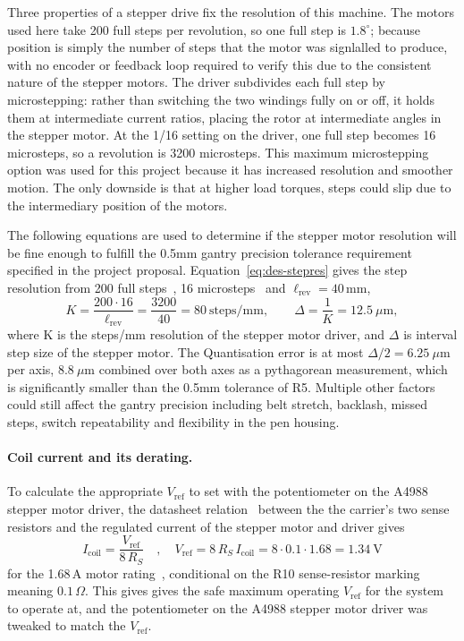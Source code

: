 Three properties of a stepper drive fix the resolution of this machine. The motors used here take 200 full steps per revolution, so one full step is $1.8^\circ$; because position is simply the number of steps that the motor was signlalled to produce, with no encoder or feedback loop required to verify this due to the consistent nature of the stepper motors. The driver subdivides each full step by microstepping: rather than switching the two windings fully on or off, it holds them at intermediate current ratios, placing the rotor at intermediate angles in the stepper motor. At the 1/16 setting on the driver, one full step becomes 16 microsteps, so a revolution is 3200 microsteps. This maximum microstepping option was used for this project because it has increased resolution and smoother motion. The only downside is that at higher load torques, steps could slip due to the intermediary position of the motors.

The following equations are used to determine if the stepper motor resolution will be fine enough to fulfill the 0.5mm gantry precision tolerance requirement specified in the project proposal. Equation~\ref{eq:des-stepres} gives the step resolution from 200 full steps~\cite{stepperds}, 16 microsteps~\cite[p.~6]{a4988ds} and $\ell_{\mathrm{rev}}=40$\,mm,
\begin{equation}
K=\frac{200\cdot16}{\ell_{\mathrm{rev}}}=\frac{3200}{40}=80\ \mathrm{steps/mm},\qquad\Delta=\frac1K=12.5\ \mu\mathrm{m},
\label{eq:des-stepres}
\end{equation}
where K is the steps/mm resolution of the stepper motor driver, and $\Delta$ is interval step size of the stepper motor. The  Quantisation error is at most $\Delta/2=6.25\ \mu$m per axis, $8.8\ \mu$m combined over both axes as a pythagorean measurement, which is significantly smaller than the 0.5mm tolerance of R5. Multiple other factors could still affect the gantry precision including belt stretch, backlash, missed steps, switch repeatability and flexibility in the pen housing.
\paragraph{Coil current and its derating.}
To calculate the appropriate $V_{\mathrm{ref}}$ to set with the potentiometer on the A4988 stepper motor driver, the datasheet relation~\cite[p.~9]{a4988ds} between the the carrier's two sense resistors and the regulated current of the stepper motor and driver gives
\begin{equation}
I_{\mathrm{coil}}=\frac{V_{\mathrm{ref}}}{8\,R_S}\quad, \quad V_{\mathrm{ref}}=8\,R_S\,I_{\mathrm{coil}}=8\cdot0.1\cdot1.68=1.34\ \mathrm{V}
\label{eq:des-current}
\end{equation}
for the 1.68\,A motor rating~\cite{stepperds}, conditional on the R10 sense-resistor marking meaning $0.1\,\Omega$. This gives gives the safe maximum operating $V_{\mathrm{ref}}$ for the system to operate at, and the potentiometer on the A4988 stepper motor driver was tweaked to match the $V_{\mathrm{ref}}$.

